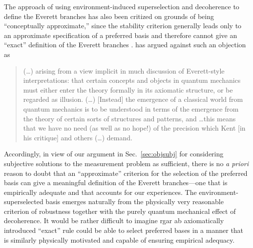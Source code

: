 \documentclass[twocolumn,rmp,aps,amsmath,amsfonts,noshowkeys,noshowpacs]{revtex4}
\begin{document}
The approach of using environment-induced superselection and
decoherence to define the Everett branches has also been critized on
grounds of being ``conceptually approximate,'' since the stability
criterion generally leads only to an approximate specification of a
preferred basis and therefore cannot give an ``exact'' definition of
the Everett branches \citetext{see, for example, the comments of
  \citealp{Zeh:1973:wq,Kent:1990:nm}, and also the well-known
  ``anti-FAPP'' position of \citealp{Bell:1982:ag}}.
\citet[pp.~90--91]{Wallace:2003:iz} has argued against such an
objection as
%
\begin{quote} {\small
    (\dots) arising from a view implicit in much discussion of
    Everett-style interpretations: that certain concepts and objects
    in quantum mechanics must either enter the theory formally in its
    axiomatic structure, or be regarded as illusion. (\dots) [Instead]
    the emergence of a classical world from quantum mechanics is to be
    understood in terms of the emergence from the theory of certain
    sorts of structures and patterns, and \dots this means that we have
    no need (as well as no hope!) of the precision which Kent [in his
    \citeyearpar{Kent:1990:nm} critique] and others (\dots) demand.}
\end{quote}
%
Accordingly, in view of our argument in Sec.~\ref{sec:objsubj} for
considering subjective solutions to the measurement problem as
sufficient, there is no {\em a priori} reason to doubt that an
``approximate'' criterion for the selection of the preferred basis can
give a meaningful definition of the Everett branches---one that is
empirically adequate and that accounts for our experiences. The
environment-superselected basis emerges naturally from the physically
very reasonable criterion of robustness together with the purely
quantum mechanical effect of decoherence. It would be rather difficult
to imagine rgar ab axiomatically introduced ``exact'' rule could be
able to select preferred bases in a manner that is similarly
physically motivated and capable of ensuring empirical adequacy.
\end{document}

